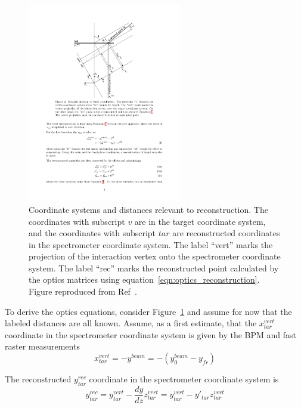 \begin{figure}[!h]
    \centering
    \includegraphics[width=0.6\textwidth]{chap4/optics_coordinates.pdf}
    \caption{
            Coordinate systems and distances relevant to reconstruction.
            The coordinates with subscript $v$ are in the target coordinate
            system,
            and the coordinates with subscript $tar$ are reconstructed
            coordinates in the spectrometer coordinate system.
            The label ``vert'' marks the projection of the interaction vertex
            onto the spectrometer coordinate system.
            The label ``rec'' marks the reconstructed point calculated by the
            optics matrices using equation~\ref{eqn:optics_reconstruction}.
            Figure reproduced from Ref~\cite{Bericic_2017}.
            }
    \label{fig:optics_coordinates}
\end{figure}

To derive the optics equations, consider Figure~\ref{fig:optics_coordinates} and
assume for now that the labeled distances are all known.
Assume, as a first estimate, that the $x^{vert}_{tar}$ coordinate in the
spectrometer coordinate system is given by the BPM and fast raster measurements
\begin{equation}
    x^{vert}_{tar} = -y^{beam} = -(y_0^{beam} - y_{fr})
\end{equation}

The reconstructed $y^{rec}_{tar}$ coordinate in the spectrometer coordinate
system is
\begin{equation} \label{eqn:yrectar}
    y^{rec}_{tar} = y^{vert}_{tar} - \frac{dy}{dz} z^{vert}_{tar}
                  = y^{vert}_{tar} - y'_{tar} z^{vert}_{tar}
\end{equation}

